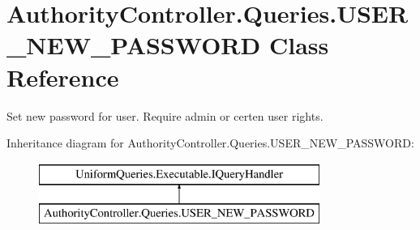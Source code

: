 \hypertarget{class_authority_controller_1_1_queries_1_1_u_s_e_r___n_e_w___p_a_s_s_w_o_r_d}{}\section{Authority\+Controller.\+Queries.\+U\+S\+E\+R\+\_\+\+N\+E\+W\+\_\+\+P\+A\+S\+S\+W\+O\+RD Class Reference}
\label{class_authority_controller_1_1_queries_1_1_u_s_e_r___n_e_w___p_a_s_s_w_o_r_d}


Set new password for user. Require admin or certen user rights.  


Inheritance diagram for Authority\+Controller.\+Queries.\+U\+S\+E\+R\+\_\+\+N\+E\+W\+\_\+\+P\+A\+S\+S\+W\+O\+RD\+:\begin{figure}[H]
\begin{center}
\leavevmode
\includegraphics[height=2.000000cm]{d5/d21/class_authority_controller_1_1_queries_1_1_u_s_e_r___n_e_w___p_a_s_s_w_o_r_d}
\end{center}
\end{figure}
